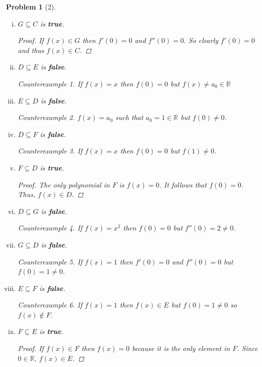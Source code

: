 \documentclass{article}
\theoremstyle{problem}
\newtheorem{prob}{Problem}
\theoremstyle{plain}
\theoremstyle{remark}
\newtheorem{countex}{Counterexample}
\begin{document}
\begin{prob}[2]
\begin{enumerate}[a)]
\begin{enumerate}[i.]
        \item $G \subseteq C$ is \textbf{true}.
          \begin{proof}
            If $f(x) \in G$ then $f'(0) = 0$ and $f''(0) = 0$. So clearly $f'(0) = 0$ and thus $f(x) \in C$.
          \end{proof}
        \item $D \subseteq E$ is \textbf{false}.
          \begin{countex}
            If $f(x) = x$ then $f(0) = 0$ but $f(x) \not = a_0 \in \mathbb{R}$
          \end{countex}
        \item $E \subseteq D$ is \textbf{false}.
          \begin{countex}
            $f(x) = a_0$ such that $a_0 = 1 \in \mathbb{R}$ but $f(0) \not = 0$.
          \end{countex}
        \item $D \subseteq F$ is \textbf{false}.
          \begin{countex}
            If $f(x) = x$ then $f(0) = 0$ but $f(1) \not = 0$.
          \end{countex}
        \item $F \subseteq D$ is \textbf{true}.
          \begin{proof}
            The only polynomial in $F$ is $f(x) = 0$. It follows that $f(0) = 0$. Thus, $f(x) \in D$.
          \end{proof}
        \item $D \subseteq G$ is \textbf{false}.
          \begin{countex}
            If $f(x) = x^2$ then $f(0) = 0$ but $f''(0) = 2 \not = 0$.
          \end{countex}
        \item $G \subseteq D$ is \textbf{false}.
          \begin{countex}
            If $f(x) = 1$ then $f'(0) = 0$ and $f''(0) = 0$ but $f(0) = 1 \not = 0$.
          \end{countex}      
        \item $E \subseteq F$ is \textbf{false}.
          \begin{countex}
            If $f(x) = 1$ then $f(x) \in E$ but $f(0) = 1 \not = 0$ so $f(x) \not \in F$.
          \end{countex}
        \item $F \subseteq E$ is \textbf{true}.
          \begin{proof}
            If $f(x) \in F$ then $f(x) = 0$ because it is the only element in $F$. Since $0 \in \mathbb{R}$, $f(x) \in E$.

\end{proof}
\end{enumerate}
\end{enumerate}
\end{prob}
\end{document}
